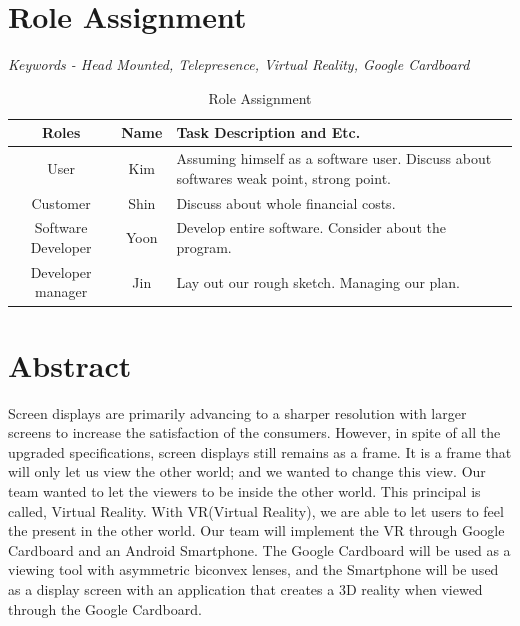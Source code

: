 \documentclass[12pt]{article}
\begin{document}
\tableofcontents
{}
\cleardoublepage


\section*{Role Assignment}
{\footnotesize \noindent \textit {Keywords - Head Mounted, Telepresence, Virtual Reality, Google Cardboard }}\\
\begin{table}[htb]
\centering
\caption[Role Assignment]{Role Assignment}
\begin{tabular}{|c|c|p{6cm}|}
\hline
\textbf{Roles}& \textbf{Name} & \textbf{Task Description and Etc.}\\ \hline

User & Kim & Assuming himself as a software user.
Discuss about softwares weak point, strong point.\\ \hline

Customer & Shin & Discuss about whole financial costs. \\ \hline

Software Developer & Yoon & Develop entire software. Consider about the program.\\ \hline

Developer manager & Jin & Lay out our rough sketch. Managing our plan.\\ \hline

\end{tabular}
\end{table}


\setcounter{page}{1}
\section{Abstract}

Screen displays are primarily advancing to a sharper resolution with larger screens to increase the satisfaction of the consumers. However, in spite of all the upgraded specifications, screen displays still remains as a frame. It is a frame that will only let us view the other world; and we wanted to change this view. Our team wanted to let the viewers to be inside the other world. This principal is called, Virtual Reality. With VR(Virtual Reality), we are able to let users to feel the present in the other world. Our team will implement the VR through Google Cardboard and an Android Smartphone. The Google Cardboard will be used as a viewing tool with asymmetric biconvex lenses, and the Smartphone will be used as a display screen with an application that creates a 3D reality when viewed through the Google Cardboard.\\
\end{document}
